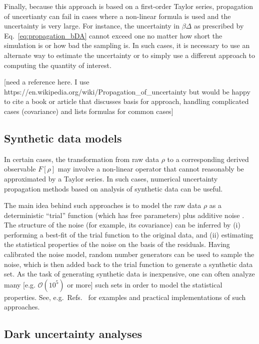 Finally, because this approach is based on a first-order Taylor series, propagation of uncertianty can fail in cases where a non-linear formula is used and the uncertainty is very large.  For instance, the uncertainty in $\beta \Delta$ as prescribed by Eq.~\ref{eq:propagation_bDA} cannot exceed one no matter how short the simulation is or how bad the sampling is.  In such cases, it is necessary to use an alternate way to estimate the uncertainty or to simply use a different approach to computing the quantity of interest.

[need a reference here.  I use https://en.wikipedia.org/wiki/Propagation_of_uncertainty but would be happy to cite a book or article that discusses basis for approach, handling complicated cases (covariance) and lists formulas for common cases]

\subsection{Synthetic data models}
 
In certain cases, the transformation from raw data $\rho$ to a corresponding derived observable $F[\rho]$ may involve a non-linear operator that cannot reasonably be approximated by a Taylor series.  In such cases, numerical uncertainty propagation methods based on analysis of synthetic data can be useful.  

The main idea behind such approaches is to model the raw data $\rho$ as a deterministic ``trial'' function (which has free parameters) plus additive noise \cite{patrone1,patrone2,patrone3}.  The structure of the noise (for example, its covariance) can be inferred by (i) performing a best-fit of the trial function to the original data, and (ii) estimating the statistical properties of the noise on the basis of the residuals.  Having calibrated the noise model, random number generators can be used to sample the noise, which is then added back to the trial function to generate a synthetic data set.  As the task of generating synthetic data is inexpensive, one can often analyze many [e.g. $\mathcal O(10^5)$ or more] such sets in order to model the statistical properties.  See, e.g.\ Refs.~\cite{patrone1,patrone2,patrone3} for examples and practical implementations of such approaches.  


\subsection{Dark uncertainty analyses}

